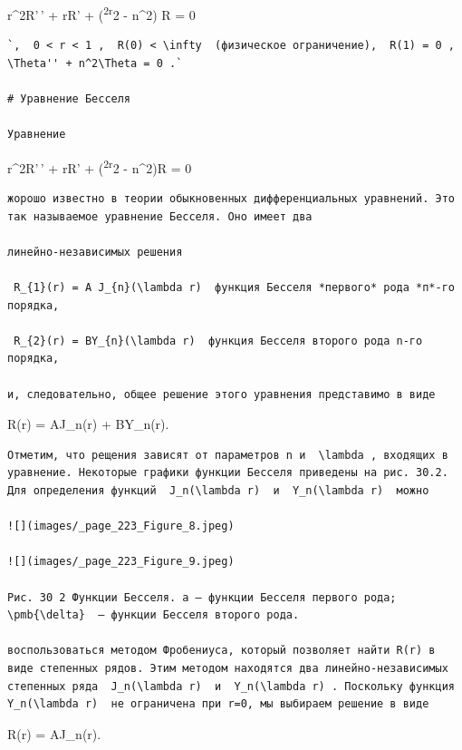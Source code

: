\documentclass[
  ukrainian,
]{article}
\begin{document}
r\^{}2R'\,' + rR' + (\lambda\textsuperscript{2r}2 - n\^{}2) R = 0

\begin{verbatim}
`,  0 < r < 1 ,  R(0) < \infty  (физическое ограничение),  R(1) = 0 ,  \Theta'' + n^2\Theta = 0 .`

# Уравнение Бесселя

Уравнение
\end{verbatim}

r\^{}2R'\,' + rR' + (\lambda\textsuperscript{2r}2 - n\^{}2)R = 0

\begin{verbatim}
жорошо известно в теории обыкновенных дифференциальных уравнений. Это так называемое уравнение Бесселя. Оно имеет два

линейно-независимых решения

 R_{1}(r) = A J_{n}(\lambda r)  функция Бесселя *первого* рода *п*-го порядка,

 R_{2}(r) = BY_{n}(\lambda r)  функция Бесселя второго рода n-го порядка,

и, следовательно, общее решение этого уравнения представимо в виде
\end{verbatim}

R(r) = AJ\_n(\lambda r) + BY\_n(\lambda r).

\begin{verbatim}
Отметим, что рещения зависят от параметров n и  \lambda , входящих в уравнение. Некоторые графики функции Бесселя приведены на рис. 30.2. Для определения функций  J_n(\lambda r)  и  Y_n(\lambda r)  можно

![](images/_page_223_Figure_8.jpeg)

![](images/_page_223_Figure_9.jpeg)

Рис. 30 2 Функции Бесселя. a — функции Бесселя первого рода;  \pmb{\delta}  — функции Бесселя второго рода.

воспользоваться методом Фробениуса, который позволяет найти R(r) в виде степенных рядов. Этим методом находятся два линейно-независимых степенных ряда  J_n(\lambda r)  и  Y_n(\lambda r) . Поскольку функция  Y_n(\lambda r)  не ограничена при r=0, мы выбираем решение в виде
\end{verbatim}

R(r) = AJ\_n(\lambda r).
\end{document}
